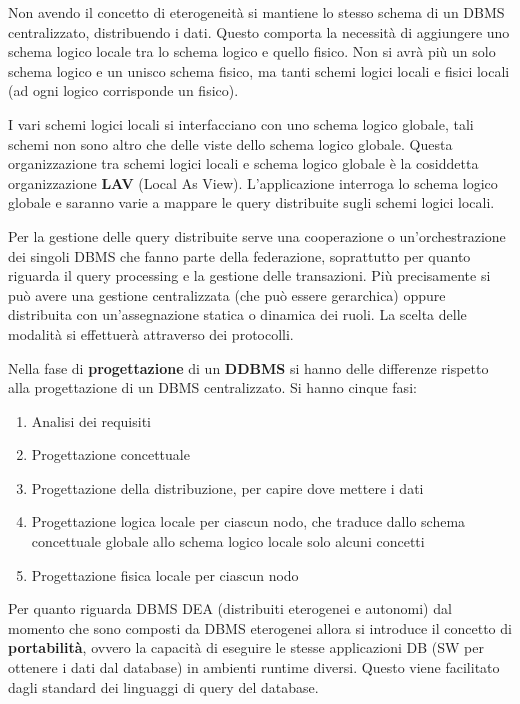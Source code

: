 Non avendo il concetto di eterogeneità si mantiene lo stesso schema di un DBMS
centralizzato, distribuendo i dati. Questo comporta la necessità di aggiungere
uno schema logico locale tra lo schema logico e quello fisico. Non si avrà più
un solo schema logico e un unisco schema fisico, ma tanti schemi logici locali e
fisici locali (ad ogni logico corrisponde un fisico).

I vari schemi logici locali si interfacciano con uno schema logico globale,
tali schemi non sono altro che delle viste dello schema logico globale. Questa
organizzazione tra schemi logici locali e schema logico globale è la cosiddetta
organizzazione \textbf{LAV} (Local As View). L'applicazione interroga
lo schema logico globale e saranno varie a mappare le query distribuite sugli schemi
logici locali.


Per la gestione delle query distribuite serve una cooperazione o un'orchestrazione
dei singoli DBMS che fanno parte della federazione, soprattutto per quanto riguarda
il query processing e la gestione delle transazioni. Più precisamente si può avere
una gestione centralizzata (che può essere gerarchica) oppure distribuita con
un'assegnazione statica o dinamica dei ruoli. La scelta delle modalità
si effettuerà attraverso dei protocolli.

Nella fase di \textbf{progettazione} di un \textbf{DDBMS} si hanno delle
differenze rispetto alla progettazione di un DBMS centralizzato. Si hanno cinque fasi:
\begin{enumerate}
      \item Analisi dei requisiti
      \item Progettazione concettuale
      \item Progettazione della distribuzione, per capire dove mettere i dati
      \item Progettazione logica locale per ciascun nodo, che traduce dallo schema
            concettuale globale allo schema logico locale solo alcuni concetti
      \item Progettazione fisica locale per ciascun nodo
\end{enumerate}
Per quanto riguarda DBMS DEA (distribuiti eterogenei e autonomi) dal momento che
sono composti da DBMS eterogenei allora si introduce il concetto di \textbf{portabilità},
ovvero la capacità di eseguire le stesse applicazioni DB (SW per ottenere i dati
dal database) in ambienti runtime diversi. Questo viene facilitato dagli standard
dei linguaggi di query del database.


